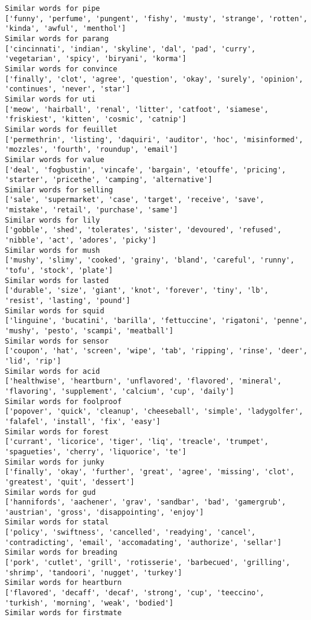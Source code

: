 \documentclass[11pt]{article}
\begin{document}
\begin{Verbatim}[commandchars=\\\{\}]
Similar words for pipe
['funny', 'perfume', 'pungent', 'fishy', 'musty', 'strange', 'rotten', 'kinda', 'awful', 'menthol']
Similar words for parang
['cincinnati', 'indian', 'skyline', 'dal', 'pad', 'curry', 'vegetarian', 'spicy', 'biryani', 'korma']
Similar words for convince
['finally', 'clot', 'agree', 'question', 'okay', 'surely', 'opinion', 'continues', 'never', 'star']
Similar words for uti
['meow', 'hairball', 'renal', 'litter', 'catfoot', 'siamese', 'friskiest', 'kitten', 'cosmic', 'catnip']
Similar words for feuillet
['permethrin', 'listing', 'daquiri', 'auditor', 'hoc', 'misinformed', 'mozzles', 'fourth', 'roundup', 'email']
Similar words for value
['deal', 'fogbustin', 'vincafe', 'bargain', 'etouffe', 'pricing', 'starter', 'pricethe', 'camping', 'alternative']
Similar words for selling
['sale', 'supermarket', 'case', 'target', 'receive', 'save', 'mistake', 'retail', 'purchase', 'same']
Similar words for lily
['gobble', 'shed', 'tolerates', 'sister', 'devoured', 'refused', 'nibble', 'act', 'adores', 'picky']
Similar words for mush
['mushy', 'slimy', 'cooked', 'grainy', 'bland', 'careful', 'runny', 'tofu', 'stock', 'plate']
Similar words for lasted
['durable', 'size', 'giant', 'knot', 'forever', 'tiny', 'lb', 'resist', 'lasting', 'pound']
Similar words for squid
['linguine', 'bucatini', 'barilla', 'fettuccine', 'rigatoni', 'penne', 'mushy', 'pesto', 'scampi', 'meatball']
Similar words for sensor
['coupon', 'hat', 'screen', 'wipe', 'tab', 'ripping', 'rinse', 'deer', 'lid', 'rip']
Similar words for acid
['healthwise', 'heartburn', 'unflavored', 'flavored', 'mineral', 'flavoring', 'supplement', 'calcium', 'cup', 'daily']
Similar words for foolproof
['popover', 'quick', 'cleanup', 'cheeseball', 'simple', 'ladygolfer', 'falafel', 'install', 'fix', 'easy']
Similar words for forest
['currant', 'licorice', 'tiger', 'liq', 'treacle', 'trumpet', 'spagueties', 'cherry', 'liquorice', 'te']
Similar words for junky
['finally', 'okay', 'further', 'great', 'agree', 'missing', 'clot', 'greatest', 'quit', 'dessert']
Similar words for gud
['hannifords', 'aachener', 'grav', 'sandbar', 'bad', 'gamergrub', 'austrian', 'gross', 'disappointing', 'enjoy']
Similar words for statal
['policy', 'swiftness', 'cancelled', 'readying', 'cancel', 'contradicting', 'email', 'accomadating', 'authorize', 'sellar']
Similar words for breading
['pork', 'cutlet', 'grill', 'rotisserie', 'barbecued', 'grilling', 'shrimp', 'tandoori', 'nugget', 'turkey']
Similar words for heartburn
['flavored', 'decaff', 'decaf', 'strong', 'cup', 'teeccino', 'turkish', 'morning', 'weak', 'bodied']
Similar words for firstmate

\end{Verbatim}
\end{document}
